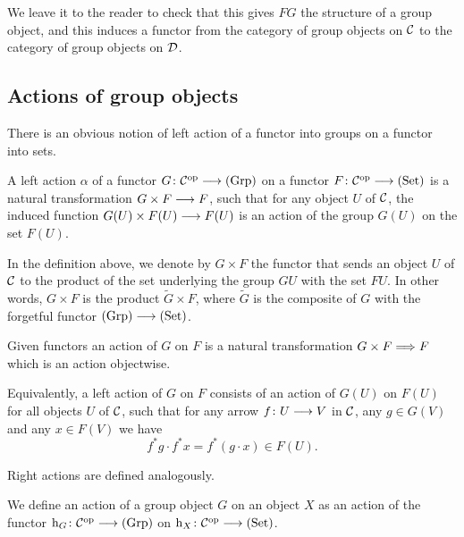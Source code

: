 \begin{2   CONTRAVARIANT FUNCTORS}
\begin{2.2 Group objects}
\begin{remark}
We leave it to the reader to check that this gives $FG$ the structure of a group object, and this induces a functor from the category of group objects on $\mathcal{C}$ to the category of group objects on $\mathcal{D}$.
\end{remark}






\subsection{Actions of group objects}\label{subsec:actions}


There is an obvious notion of left action of a functor into groups on a functor into sets.

\begin{definition}%
A left action $\alpha$ of a functor $G \colon \cC\op \arr \catgrp$ on a functor $F \colon \cC\op \arr \catset$ is a natural transformation $G \times F \arr F$, such that for any object $U$ of $\mathcal{C}$, the induced function $G(U) \times F(U) \arr F(U)$ is an action of the group $G(U)$ on the set $F(U)$.
\end{definition}

In the definition above, we denote by $G \times F$ the functor that sends an object $U$ of $\mathcal{C}$ to the product of the set underlying the group $GU$ with the set $FU$. In other words, $G \times F$ is the product $\widetilde{G} \times F$, where $\widetilde{G}$ is the composite of $G$ with the forgetful functor $\catgrp \arr \catset$.
\begin{shaded}
Given functors 
an action of $G$ on $F$ is a natural transformation $G\times F\Longrightarrow F$ which is an action objectwise.
\end{shaded}

Equivalently, a left action of $G$ on $F$ consists of an action of $G(U)$ on $F(U)$ for all objects $U$ of $\mathcal{C}$, such that for any arrow $f \colon U \arr V$ in $\mathcal{C}$, any $g \in G(V)$ and any $x \in F(V)$ we have
   \[
   f^*g \cdot f^*x = f^*(g \cdot x) \in F(U).
   \]

Right actions are defined analogously.

We define an action of a group object $G$ on an object $X$ as an action of the functor $\h_G \colon \cC\op \arr \catgrp$ on $\h_X \colon \cC\op \arr \catset$.


\end{2.2 Group objects}
\end{2   CONTRAVARIANT FUNCTORS}
